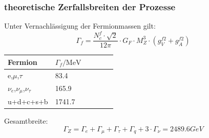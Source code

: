 \begin{frame}
	\frametitle{theoretische Zerfallsbreiten der Prozesse}
	Unter Vernachlässigung der Fermionmassen gilt:
	\begin{equation*}	
	\Gamma_f=\frac{N_c^f \cdot \sqrt{2}}{12\pi}\cdot G_F \cdot M_Z^3 \cdot (g_V^{f2}+g_A^{f2})
	\end{equation*}
	\begin{table}[H]\centering
		\begin{tabular}{@{}llllll@{}}
			\toprule
			Fermion & $\Gamma _f\text{/MeV}$ \\
			\midrule
			e,$\mu $,$\tau $ & 83.4\\
			$\nu _e$,$\nu _{\mu }$,$\nu _{\tau }$ & 165.9\\
			u+d+c+s+b & 1741.7 \\
			\bottomrule
		\end{tabular}
	\end{table}
	Gesamtbreite:
	\begin{equation*}
	\Gamma_Z = \Gamma_e+ \Gamma_{\mu} + \Gamma_{\tau}+\Gamma_q + 3 \cdot \Gamma_{\nu}= 2489.6 GeV
	\end{equation*}
\end{frame}
